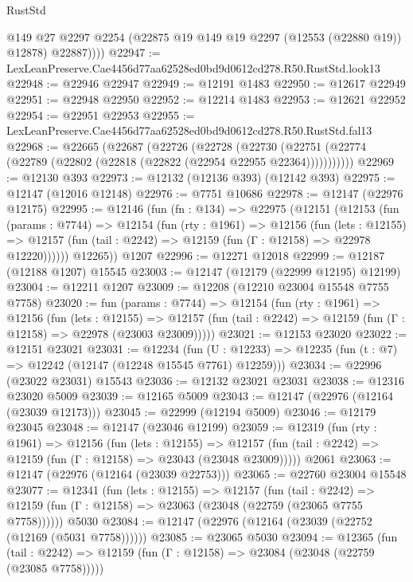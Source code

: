 \begin{lexlean}{RustStd}
\begin{coremodule}
            @149
            @27
            @2297
            @2254
            (@22875 @19 @149 @19 @2297 (@12553 (@22880 @19)) @12878)
            @22887))))
@22947 := LexLeanPreserve.Cae4456d77aa62528ed0bd9d0612cd278.R50.RustStd.look13
@22948 := @22946 @22947
@22949 := @12191 @1483
@22950 := @12617 @22949
@22951 := @22948 @22950
@22952 := @12214 @1483
@22953 := @12621 @22952
@22954 := @22951 @22953
@22955 := LexLeanPreserve.Cae4456d77aa62528ed0bd9d0612cd278.R50.RustStd.fal13
@22968 := @22665
    (@22687
      (@22726
        (@22728
          (@22730 (@22751 (@22774 (@22789 (@22802 (@22818 (@22822 (@22954 @22955 @22364)))))))))))
@22969 := @12130 @393
@22973 := @12132 (@12136 @393) (@12142 @393)
@22975 := @12147 (@12016 @12148)
@22976 := @7751 @10686
@22978 := @12147 (@22976 @12175)
@22995 := @12146
    (fun (fn : @134) =>
    @22975
      (@12151
        (@12153
          (fun (params : @7744) =>
          @12154
            (fun (rty : @1961) =>
            @12156
              (fun (lets : @12155) =>
              @12157 (fun (tail : @2242) => @12159 (fun (Γ : @12158) => @22978 @12220))))))
        @12265))
    @1207
@22996 := @12271 @12018
@22999 := @12187 (@12188 @1207) @15545
@23003 := @12147 (@12179 (@22999 @12195) @12199)
@23004 := @12211 @1207
@23009 := @12208 (@12210 @23004 @15548 @7755 @7758)
@23020 := fun (params : @7744) =>
  @12154
    (fun (rty : @1961) =>
    @12156
      (fun (lets : @12155) =>
      @12157 (fun (tail : @2242) => @12159 (fun (Γ : @12158) => @22978 (@23003 @23009)))))
@23021 := @12153 @23020
@23022 := @12151 @23021
@23031 := @12234
    (fun (U : @12233) => @12235 (fun (t : @7) => @12242 (@12147 (@12248 @15545 @7761) @12259)))
@23034 := @22996 (@23022 @23031) @15543
@23036 := @12132 @23021 @23031
@23038 := @12316 @23020 @5009
@23039 := @12165 @5009
@23043 := @12147 (@22976 (@12164 (@23039 @12173)))
@23045 := @22999 (@12194 @5009)
@23046 := @12179 @23045
@23048 := @12147 (@23046 @12199)
@23059 := @12319
    (fun (rty : @1961) =>
    @12156
      (fun (lets : @12155) =>
      @12157 (fun (tail : @2242) => @12159 (fun (Γ : @12158) => @23043 (@23048 @23009)))))
    @2061
@23063 := @12147 (@22976 (@12164 (@23039 @22753)))
@23065 := @22760 @23004 @15548
@23077 := @12341
    (fun (lets : @12155) =>
    @12157
      (fun (tail : @2242) =>
      @12159 (fun (Γ : @12158) => @23063 (@23048 (@22759 (@23065 @7755 @7758))))))
    @5030
@23084 := @12147 (@22976 (@12164 (@23039 (@22752 (@12169 (@5031 @7758))))))
@23085 := @23065 @5030
@23094 := @12365
    (fun (tail : @2242) => @12159 (fun (Γ : @12158) => @23084 (@23048 (@22759 (@23085 @7758)))))

\end{coremodule}
\end{lexlean}
